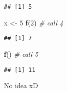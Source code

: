\documentclass[12,]{article}
\newenvironment{Shaded}{\begin{snugshade}}{\end{snugshade}}
\newcommand{\KeywordTok}[1]{\textcolor[rgb]{0.13,0.29,0.53}{\textbf{#1}}}
\newcommand{\DecValTok}[1]{\textcolor[rgb]{0.00,0.00,0.81}{#1}}
\newcommand{\StringTok}[1]{\textcolor[rgb]{0.31,0.60,0.02}{#1}}
\newcommand{\CommentTok}[1]{\textcolor[rgb]{0.56,0.35,0.01}{\textit{#1}}}
\newcommand{\NormalTok}[1]{#1}
\begin{document}
\begin{verbatim}
## [1] 5
\end{verbatim}

\begin{Shaded}
\begin{Highlighting}[]
\NormalTok{x <-}\StringTok{ }\DecValTok{5}
\KeywordTok{f}\NormalTok{(}\DecValTok{2}\NormalTok{) }\CommentTok{# call 4 }
\end{Highlighting}
\end{Shaded}

\begin{verbatim}
## [1] 7
\end{verbatim}

\begin{Shaded}
\begin{Highlighting}[]
\KeywordTok{f}\NormalTok{() }\CommentTok{# call 5}
\end{Highlighting}
\end{Shaded}

\begin{verbatim}
## [1] 11
\end{verbatim}

No idea xD
\end{document}
